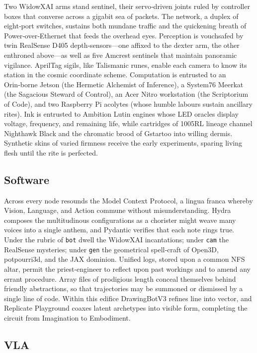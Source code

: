 \documentclass[11pt]{article}
\begin{document}
Two WidowXAI arms stand sentinel, their servo‑driven joints ruled by controller boxes that converse across a gigabit sea of packets.  
The network, a duplex of eight‑port switches, sustains both mundane traffic and the quickening breath of Power‑over‑Ethernet that feeds the overhead eyes.  
Perception is vouchsafed by twin RealSense D405 depth‑sensors—one affixed to the dexter arm, the other enthroned above—as well as five Amcrest sentinels that maintain panoramic vigilance.  
AprilTag sigils, like Talismanic runes, enable each camera to know its station in the cosmic coordinate scheme.  
Computation is entrusted to an Orin‑borne Jetson (the Hermetic Alchemist of Inference), a System76 Meerkat (the Sagacious Steward of Control), an Acer Nitro workstation (the Scriptorium of Code), and two Raspberry Pi acolytes (whose humble labours sustain ancillary rites).  
Ink is entrusted to Ambition Lutin engines whose LED oracles display voltage, frequency, and remaining life, while cartridges of 1005RL lineage channel Nighthawk Black and the chromatic brood of Gstartoo into willing dermis.  
Synthetic skins of varied firmness receive the early experiments, sparing living flesh until the rite is perfected.

\subsection{Software}

Across every node resounds the Model Context Protocol, a lingua franca whereby Vision, Language, and Action commune without misunderstanding.  
Hydra composes the multitudinous configurations as a chorister might weave many voices into a single anthem, and Pydantic verifies that each note rings true.  
Under the rubric of \texttt{bot} dwell the WidowXAI incantations; under \texttt{cam} the RealSense mysteries; under \texttt{gen} the geometrical spell‑craft of Open3D, potpourri3d, and the JAX dominion.  
Unified logs, stored upon a common NFS altar, permit the priest‑engineer to reflect upon past workings and to amend any errant procedure.  
Array files of prodigious length conceal themselves behind friendly abstractions, so that trajectories may be summoned or dismissed by a single line of code.  
Within this edifice DrawingBotV3 refines line into vector, and Replicate Playground coaxes latent archetypes into visible form, completing the circuit from Imagination to Embodiment.

\subsection{VLA}
\end{document}
